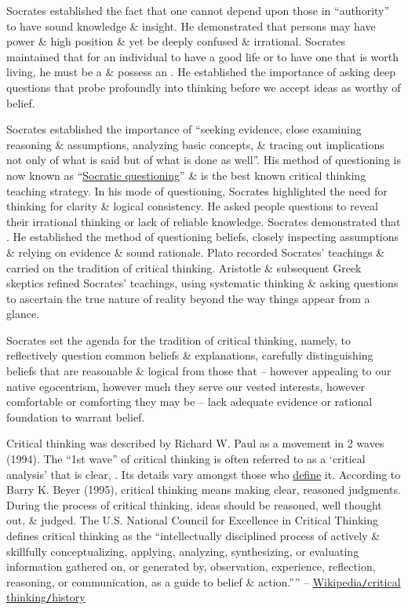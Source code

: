 \documentclass[oneside]{book}
\numberwithin{equation}{section}
\begin{document}
Socrates established the fact that one cannot depend upon those in ``authority'' to have sound knowledge \& insight. He demonstrated that persons may have power \& high position \& yet be deeply confused \& irrational. Socrates maintained that for an individual to have a good life or to have one that is worth living, he must be a  \& possess an . He established the importance of asking deep questions that probe profoundly into thinking before we accept ideas as worthy of belief.

Socrates established the importance of ``seeking evidence, close examining reasoning \& assumptions, analyzing basic concepts, \& tracing out implications not only of what is said but of what is done as well''. His method of questioning is now known as ``\href{https://en.wikipedia.org/wiki/Socratic_questioning}{Socratic questioning}'' \& is the best known critical thinking teaching strategy. In his mode of questioning, Socrates highlighted the need for thinking for clarity \& logical consistency. He asked people questions to reveal their irrational thinking or lack of reliable knowledge. Socrates demonstrated that . He established the method of questioning beliefs, closely inspecting assumptions \& relying on evidence \& sound rationale. Plato recorded Socrates' teachings \& carried on the tradition of critical thinking. Aristotle \& subsequent Greek skeptics refined Socrates' teachings, using systematic thinking \& asking questions to ascertain the true nature of reality beyond the way things appear from a glance.

Socrates set the agenda for the tradition of critical thinking, namely, to reflectively question common beliefs \& explanations, carefully distinguishing beliefs that are reasonable \& logical from those that -- however appealing to our native egocentrism, however much they serve our vested interests, however comfortable or comforting they may be -- lack adequate evidence or rational foundation to warrant belief.

Critical thinking was described by Richard W. Paul as a movement in 2 waves (1994). The ``1st wave'' of critical thinking is often referred to as a `critical analysis' that is clear, . Its details vary amongst those who \href{https://en.wikipedia.org/wiki/Operational_definition}{define} it. According to Barry K. Beyer (1995), critical thinking means making clear, reasoned judgments. During the process of critical thinking, ideas should be reasoned, well thought out, \& judged. The U.S. National Council for Excellence in Critical Thinking defines critical thinking as the ``intellectually disciplined process of actively \& skillfully conceptualizing, applying, analyzing, synthesizing, or evaluating information gathered on, or generated by, observation, experience, reflection, reasoning, or communication, as a guide to belief \& action.'''' -- \href{https://en.wikipedia.org/wiki/Critical_thinking#History}{Wikipedia\texttt{/}critical thinking\texttt{/}history}
\end{document}
